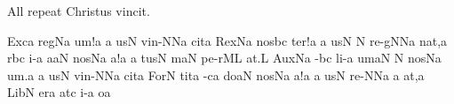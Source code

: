 \bigskip

{\itlyrics All repeat \rm Christus vincit.}

\bigskip



\initiumgregorianum
{}%
\sgn {}Ex\clivis ca\egn
\spatium
\sgn r{e}g\pes Na\egn
\sgn {}u{m!}\punctum a\egn
\spatium
\divisiofinalis
\spatium
{}\chorus\punctum a\egn
\sgn {}us\punctum N\egn
\spatium
\sgn v{i}{n-}\punctum N\spatiumparvum\epiphonus Na\egn
\sgn cit\punctum a\egn
\spatium
\divisiofinalis
\spatium
\sgn Rex\cantores\pes Na\egn
\spatium
\sgn n{o}s\pes bc\egn
\sgn te{r!}\punctum a\egn
\spatium
\divisiofinalis
\spatium
\spatium
{}\chorus\punctum a\egn
\sgn {}us\punctum N\egn
\spatium
\custos N
\lineaproxima
\sgn r{e}{-g}\punctum N\spatiumparvum\epiphonus Na\egn
\sgn na{t,}\punctum a\egn
\spatium
\divisiofinalis
\spatium
{}r\cantores\pes bc\egn
\sgn {}i-\punctum a\egn
\sgn {}a{}\clivis aN\egn
\spatium
\sgn n{o}s\pes Na\egn
{}a!\punctum a\egn
\spatium
\divisiofinalis
\spatium
{}\chorus\punctum a\egn
\sgn tus\punctum N\egn
\spatium
\sgn {}{\'\i}m\cephalicus aN\egn
\sgn pe{-r}\clivis ML\egn
\sgn {}a{t.}\punctum L\egn
\spatium
\divisiofinalis
\spatium
\sgn Aux\cantores\pes Na\egn
\sgn {}{\'\i}-\pes bc\egn
\sgn li-\punctum a\egn
\sgn {}um\clivis aN\egn
\spatium
\custos N
\lineaproxima
\sgn n{o}s\engl{}\pes Na\egn
{}u{m.}\punctum a\egn
\spatium
\divisiofinalis
\spatium
{}\chorus\punctum a\egn
\sgn {}us\punctum N\egn
\spatium
\sgn v{i}{n-}\punctum N\spatiumparvum\epiphonus Na\egn
\sgn cit\punctum a\egn
\spatium
\divisiofinalis
\spatium
\sgn For\cantores\punctum N\egn
\sgn tit\punctum a\egn
{}-\clivis ca\egn
\sgn do{}\clivis aN\egn
\spatium
\sgn n{o}s\pes Na\egn
{}a{!}\punctum a\egn
\spatium
\divisiofinalis
\spatium
{}\chorus\punctum a\egn
\sgn {}us\punctum N\egn
\spatium
\sgn r{e}{-}\punctum N\spatiumparvum\epiphonus Na\egn
\custos a
\lineaproxima
{}a{t,}\punctum a\egn
\spatium
\divisiofinalis
\spatium
\sgn Lib\cantores\punctum N\egn
\sgn {}er\punctum a\egn
\sgn {}at\punctum c\egn
\sgn {}i-\punctum a\egn
\sgn {}o{}\punctum a\egn
\spatium
\divisiominima
